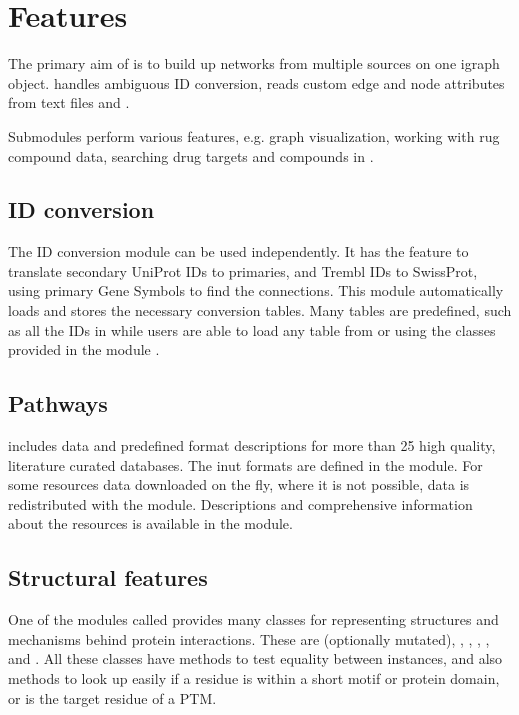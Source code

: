 \documentclass[letterpaper,10pt,english]{sphinxmanual}
\begin{document}
\chapter{Features}
\label{\detokenize{index:features}}
The primary aim of  is to build up networks from multiple sources on
one igraph object.  handles ambiguous ID conversion, reads custom
edge and node attributes from text files and .

Submodules perform various features, e.g. graph visualization, working with
rug compound data, searching drug targets and compounds in .


\section{ID conversion}
\label{\detokenize{index:id-conversion}}
The ID conversion module  can be used independently. It has the
feature to translate secondary UniProt IDs to primaries, and Trembl IDs to
SwissProt, using primary Gene Symbols to find the connections. This module
automatically loads and stores the necessary conversion tables. Many tables
are predefined, such as all the IDs in  while
users are able to load any table from  or  using the classes
provided in the module .


\section{Pathways}
\label{\detokenize{index:pathways}}
 includes data and predefined format descriptions for more than 25
high quality, literature curated databases. The inut formats are defined in
the  module. For some resources data downloaded on the fly,
where it is not possible, data is redistributed with the module. Descriptions
and comprehensive information about the resources is available in the
 module.


\section{Structural features}
\label{\detokenize{index:structural-features}}
One of the modules called  provides many classes for representing
structures and mechanisms behind protein interactions. These are 
(optionally mutated), , , , ,
 and . All these classes have 
methods to test equality between instances, and also 
methods to look up easily if a residue is within a short motif or protein
domain, or is the target residue of a PTM.
\end{document}
